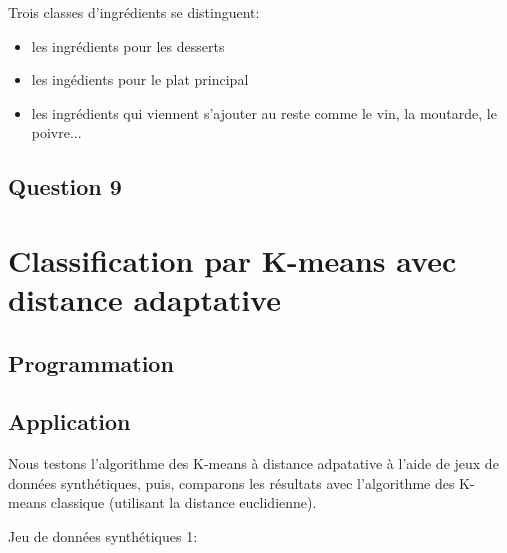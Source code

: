 \documentclass[a4paper,11pt,oneside,roman]{article}
\begin{document}
    Trois classes d'ingrédients se distinguent:
    \begin{itemize}
        \item les ingrédients pour les desserts
        \item les ingédients pour le plat principal
        \item les ingrédients qui viennent s'ajouter au reste comme le vin, la moutarde, le poivre...
    \end{itemize}

    \subsection*{Question 9}

    \section{Classification par K-means avec distance adaptative}
    \subsection{Programmation}

    \subsection{Application}
    Nous testons l'algorithme des K-means à distance adpatative à l'aide de jeux de données synthétiques, puis, comparons les résultats avec l'algorithme des K-means classique (utilisant la distance euclidienne).

    Jeu de données synthétiques 1:
\end{document}
